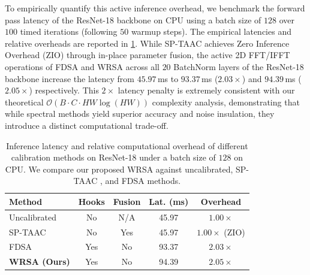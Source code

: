 \documentclass{article}
\theoremstyle{plain}
\theoremstyle{definition}
\theoremstyle{remark}
\begin{document}
To empirically quantify this active inference overhead, we benchmark the forward pass latency of the ResNet-18 backbone on CPU using a batch size of $128$ over $100$ timed iterations (following $50$ warmup steps). The empirical latencies and relative overheads are reported in \cref{tab:latency}. While SP-TAAC achieves Zero Inference Overhead (ZIO) through in-place parameter fusion, the active 2D FFT/IFFT operations of FDSA and WRSA across all $20$ BatchNorm layers of the ResNet-18 backbone increase the latency from $45.97$\,ms to $93.37$\,ms ($2.03\times$) and $94.39$\,ms ($2.05\times$) respectively. This $2\times$ latency penalty is extremely consistent with our theoretical $\mathcal{O}(B \cdot C \cdot H W \log(H W))$ complexity analysis, demonstrating that while spectral methods yield superior accuracy and noise insulation, they introduce a distinct computational trade-off.
\begin{table}[tb]
\caption{Inference latency and relative computational overhead of different calibration methods on ResNet-18 under a batch size of $128$ on CPU. We compare our proposed WRSA against uncalibrated, SP-TAAC \cite{submission9}, and FDSA \cite{submission10} methods.}
\label{tab:latency}
\vskip 0.1in
\centering
\begin{scriptsize}
\setlength{\tabcolsep}{2pt}
\begin{tabular}{lcccc}
\toprule
\textbf{Method} & \textbf{Hooks} & \textbf{Fusion} & \textbf{Lat. (ms)} & \textbf{Overhead} \\
\midrule
Uncalibrated & No & N/A & 45.97 & $1.00\times$ \\
SP-TAAC & No & Yes & 45.97 & $1.00\times$ (ZIO) \\
FDSA & Yes & No & 93.37 & $2.03\times$ \\
\textbf{WRSA (Ours)} & Yes & No & 94.39 & $2.05\times$ \\
\bottomrule
\end{tabular}
\end{scriptsize}
\vskip -0.1in
\end{table}
\end{document}
